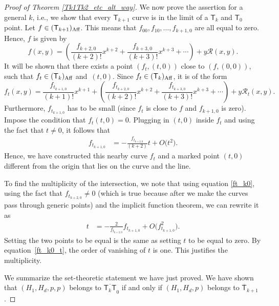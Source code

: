 \documentclass[pdftex]{sigma}
\numberwithin{equation}{section}
\begin{document}
\begin{proof}[Proof of Theorem \ref{Tk1Tk2_etc_alt_way}]
We now prove the assertion for a general $k$,
i.e., we show that
every $\mathsf{T}_{k+1}$ curve is in the limit of a $\mathsf{T}_{k}$
and $\mathsf{T}_0$ point.
Let $f \in (\mathsf{T}_{k+1})_{\textnormal{Aff}}$.
This means that $f_{00}, f_{10}, \dots, f_{k+1,0}$ are all equal to zero.
Hence, $f$ is given by
\[
f(x, y)  =  \left(\frac{f_{k+2,0}}{(k+2)!} x^{k+2} +
\frac{f_{k+3,0}}{(k+3)!} x^{k+3} + \cdots\right) + y \mathcal{R}(x, y).
\]
It will be shown that there exists a point $(f_t, (t, 0))$ close to $(f, (0, 0))$, such that
$f_t \in (\mathsf{T}_{k})_{\textnormal{Aff}}$
and~$(t, 0)$.
Since $f_t \in (\mathsf{T}_{k})_{\textnormal{Aff}}$,
it is of the form
\[
f_t(x, y) = \frac{f_{t_{k+1, 0}}}{(k+1)!}x^{k+1}+
\left(\frac{f_{t_{k+2, 0}}}{(k+2)!} x^{k+2} + \frac{f_{t_{k+3,0}}}{(k+3)!} x^{k+3} +\cdots\right) +
y \mathcal{R}_t(x, y).
\]
Furthermore, $f_{t_{k+1, 0}}$ has to be small (since $f_t$ is close to $f$ and $f_{k+1, 0}$ is zero).
Impose the condition that $f_{t}(t, 0) = 0$. Plugging in $(t, 0)$ inside $f_t$ and using the fact
that $t \neq 0$, it follows that
\begin{align}
f_{t_{k+1, 0}}&= -\frac{f_{t_{k+2, 0}}}{(k+2)} t + O\bigl(t^2\bigr). \label{ft_k0}
\end{align}
Hence, we have constructed this nearby curve $f_t$ and a marked point $(t, 0)$ different from the origin
that lies on the curve and the line.

To find the multiplicity of the intersection, we note that using equation \eqref{ft_k0},
using the fact that $f_{t_{k+2, 0}} \neq 0$ (which is true because after we make the curves
pass through generic points)
and the implicit function theorem, we can rewrite it as
\begin{align}
t & = -\frac{2}{f_{t_{k+2, 0}}} f_{t_{k+1, 0}} + O\bigl(f_{t_{k+1, 0}}^2\bigr). \label{ft_k0_t}
\end{align}
Setting the two points to be equal is the same as setting $t$ to be equal to zero.
By equation~\eqref{ft_k0_t}, the order of vanishing of $t$ is one. This
justifies the multiplicity.

We summarize the set-theoretic statement we have just proved.
We have shown that $(H_1, H_d,\allowbreak  p, p)$ belongs to $\overline{\mathsf{T}_k \mathsf{T}}_0$
if and only if $(H_1, H_d, p)$ belongs to $\overline{\mathsf{T}}_{k+1}$.


\end{proof}
\end{document}
